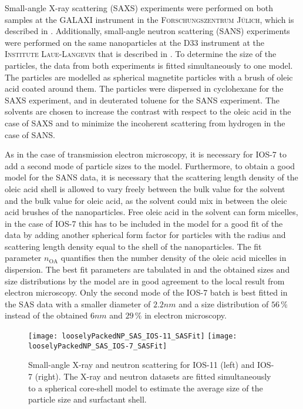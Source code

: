 \documentclass[\main/dresen_thesis.tex]{subfiles}
\begin{document}
  \label{sec:looselyPackedNS:nanoparticle:sas}

  Small-angle X-ray scattering (SAXS) experiments were performed on both samples at the \textsc{GALAXI} instrument in the \textsc{Forschungszentrum J\"ulich}, which is described in .
  Additionally, small-angle neutron scattering (SANS) experiments were performed on the same nanoparticles at the \textsc{D33} instrument at the \textsc{Institute Laue-Langevin} that is described in .
  To determine the size of the particles, the data from both experiments is fitted simultaneously to one model.
  The particles are modelled as spherical magnetite particles with a brush of oleic acid coated around them.
  The particles were dispersed in cyclohexane for the SAXS experiment, and in deuterated toluene for the SANS experiment.
  The solvents are chosen to increase the contrast with respect to the oleic acid in the case of SAXS and to minimize the incoherent scattering from hydrogen in the case of SANS.

  As in the case of transmission electron microscopy, it is necessary for IOS-7 to add a second mode of particle sizes to the model.
  Furthermore, to obtain a good model for the SANS data, it is necessary that the scattering length density of the oleic acid shell is allowed to vary freely between the bulk value for the solvent and the bulk value for oleic acid, as the solvent could mix in between the oleic acid brushes of the nanoparticles.
  Free oleic acid in the solvent can form micelles, in the case of IOS-7 this has to be included in the model for a good fit of the data by adding another spherical form factor for particles with the radius and scattering length density equal to the shell of the nanoparticles.
  The fit parameter $n_\mathrm{OA}$ quantifies then the number density of the oleic acid micelles in dispersion.
  The best fit parameters are tabulated in  and the obtained sizes and size distributions by the model are in good agreement to the local result from electron microscopy.
  Only the second mode of the IOS-7 batch is best fitted in the SAS data with a smaller diameter of $2.2 \unit{nm}$ and a size distribution of $56\,\%$ instead of the obtained $6 \unit{nm}$ and $29\,\%$ in electron microscopy.

  \begin{figure}[tb]
    \centering
    \texttt{[image: looselyPackedNP\_SAS\_IOS-11\_SASFit]}
    \texttt{[image: looselyPackedNP\_SAS\_IOS-7\_SASFit]}
    \caption{\label{fig:looselyPackedNP:nanoparticle:sas}Small-angle X-ray and neutron scattering for IOS-11 (left) and IOS-7 (right). The X-ray and neutron datasets are fitted simultaneously to a spherical core-shell model to estimate the average size of the particle size and surfactant shell.}
  \end{figure}
\end{document}
